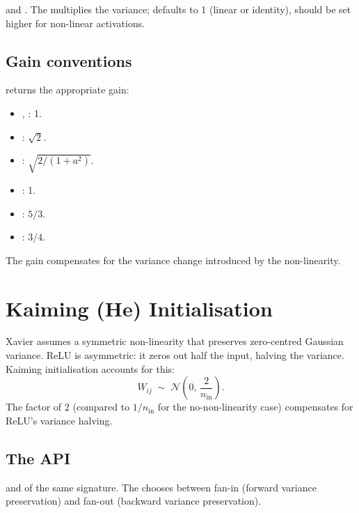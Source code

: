  and
. The
 multiplies the variance; defaults to 1 (linear or
identity), should be set higher for non-linear activations.

\subsection{Gain conventions}
\label{ssec:initialization:gain}

 returns the
appropriate gain:
\begin{itemize}
  \item {}, : 1.
  \item {}: $\sqrt{2}$.
  \item {}: $\sqrt{2 / (1 + a^2)}$.
  \item {}: 1.
  \item {}: $5/3$.
  \item {}: $3/4$.
\end{itemize}

The gain compensates for the variance change introduced by the
non-linearity.

\section{Kaiming (He) Initialisation}
\label{sec:initialization:kaiming}

Xavier assumes a symmetric non-linearity that preserves
zero-centred Gaussian variance. ReLU is asymmetric: it zeros out
half the input, halving the variance. Kaiming initialisation
accounts for this:
\[
W_{ij} \;\sim\; \mathcal{N}\!\left(0,\, \frac{2}{n_{\text{in}}}\right).
\]
The factor of 2 (compared to $1/n_{\text{in}}$ for the
no-non-linearity case) compensates for ReLU's variance halving.

\subsection{The API}
\label{ssec:initialization:kaiming_api}

and  of the same signature. The 
chooses between fan-in (forward variance preservation) and
fan-out (backward variance preservation).

